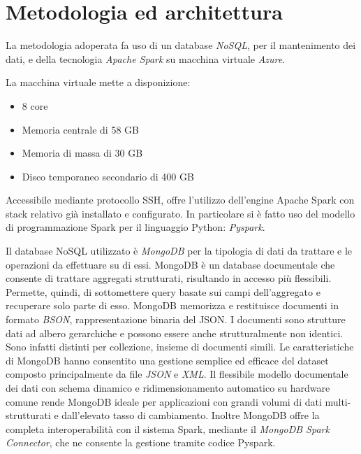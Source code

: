 \chapter{Metodologia ed architettura}
La metodologia adoperata fa uso di un database \emph{NoSQL}, per il mantenimento dei dati, e della tecnologia \emph{Apache Spark} su macchina virtuale \emph{Azure}.\par 
La macchina virtuale mette a disponizione:
\begin{itemize}
	\item 8 core
	\item Memoria centrale di 58 GB
	\item Memoria di massa di 30 GB
	\item Disco temporaneo secondario di 400 GB
\end{itemize}
Accessibile mediante protocollo SSH, offre l'utilizzo dell'engine Apache Spark con stack relativo già installato e configurato. In particolare si è fatto uso del modello di programmazione Spark per il linguaggio Python: \emph{Pyspark}.\par
Il database NoSQL utilizzato è \emph{MongoDB} per la tipologia di dati da trattare e le operazioni da effettuare su di essi. MongoDB è un database documentale che consente di trattare aggregati strutturati, risultando in accesso più flessibili. Permette, quindi, di sottomettere query basate sui campi dell'aggregato e recuperare solo parte di esso. MongoDB memorizza e restituisce documenti in formato \emph{BSON}, rappresentazione binaria del JSON. I documenti sono strutture dati ad albero gerarchiche e possono essere anche strutturalmente non identici. Sono infatti distinti per collezione, insieme di documenti simili. Le caratteristiche di MongoDB hanno consentito una gestione semplice ed efficace del dataset composto principalmente da file \emph{JSON} e \emph{XML}. Il flessibile modello documentale dei dati con schema dinamico e ridimensionamento automatico su hardware comune rende MongoDB ideale per applicazioni con grandi volumi di dati multi-strutturati e dall'elevato tasso di cambiamento. Inoltre MongoDB offre la completa interoperabilità con il sistema Spark, mediante il \emph{MongoDB Spark Connector}, che ne consente la gestione tramite codice Pyspark.

